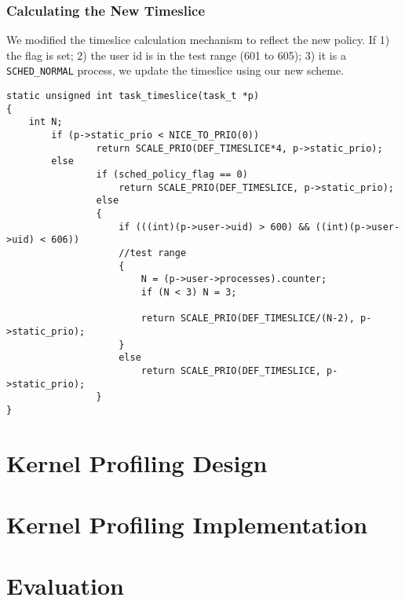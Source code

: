 \documentclass[11pt]{article}
\begin{document}
\subsubsection{Calculating the New Timeslice}
We modified the timeslice calculation mechanism to reflect the new policy. If 1) the flag is set; 2) the user id is in the test range (601 to 605); 3) it is a \texttt{SCHED\_NORMAL} process, we update the timeslice using our new scheme.
\begin{lstlisting}[style=CStyle]
static unsigned int task_timeslice(task_t *p)
{
    int N;
        if (p->static_prio < NICE_TO_PRIO(0))
                return SCALE_PRIO(DEF_TIMESLICE*4, p->static_prio);
        else
                if (sched_policy_flag == 0)
                    return SCALE_PRIO(DEF_TIMESLICE, p->static_prio);
                else
                {
                    if (((int)(p->user->uid) > 600) && ((int)(p->user->uid) < 606)) 
                    //test range
                    {
                        N = (p->user->processes).counter;
                        if (N < 3) N = 3;
                        
                        return SCALE_PRIO(DEF_TIMESLICE/(N-2), p->static_prio);
                    }
                    else
                        return SCALE_PRIO(DEF_TIMESLICE, p->static_prio);
                }
}
\end{lstlisting}

\section{Kernel Profiling Design}

\section{Kernel Profiling Implementation}

\section{Evaluation}


\end{document}
